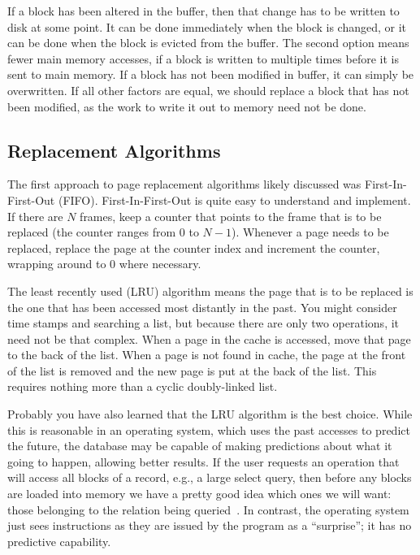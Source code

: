 \documentclass[a4paper]{report}
\begin{document}
If a block has been altered in the buffer, then that change has to be written to disk at some point. It can be done immediately when the block is changed, or it can be done when the block is evicted from the buffer. The second option means fewer main memory accesses, if a block is written to multiple times before it is sent to main memory. If a block has not been modified in buffer, it can simply be overwritten. If all other factors are equal, we should replace a block that has not been modified, as the work to write it out to memory need not be done.


\subsection*{Replacement Algorithms}

The first approach to page replacement algorithms likely discussed was First-In-First-Out (FIFO). First-In-First-Out is quite easy to understand and implement. If there are $N$ frames, keep a counter that points to the frame that is to be replaced (the counter ranges from $0$ to $N-1$). Whenever a page needs to be replaced, replace the page at the counter index and increment the counter, wrapping around to 0 where necessary.

The least recently used (LRU) algorithm means the page that is to be replaced is the one that has been accessed most distantly in the past. You might consider time stamps and searching a list, but because there are only two operations, it need not be that complex. When a page in the cache is accessed, move that page to the back of the list. When a page is not found in cache, the page at the front of the list is removed and the new page is put at the back of the list. This requires nothing more than a cyclic doubly-linked list. 

Probably you have also learned that the LRU algorithm is the best choice. While this is reasonable in an operating system, which uses the past accesses to predict the future, the database may be capable of making predictions about what it going to happen, allowing better results. If the user requests an operation that will access all blocks of a record, e.g., a large select query, then before any blocks are loaded into memory we have a pretty good idea which ones we will want: those belonging to the relation being queried~\cite{dsc}. In contrast, the operating system just sees instructions as they are issued by the program as a ``surprise''; it has no predictive capability.
\end{document}
